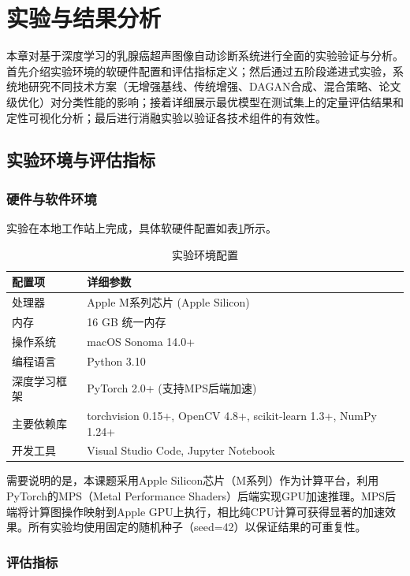 \section{实验与结果分析}

本章对基于深度学习的乳腺癌超声图像自动诊断系统进行全面的实验验证与分析。首先介绍实验环境的软硬件配置和评估指标定义；然后通过五阶段递进式实验，系统地研究不同技术方案（无增强基线、传统增强、DAGAN合成、混合策略、论文级优化）对分类性能的影响；接着详细展示最优模型在测试集上的定量评估结果和定性可视化分析；最后进行消融实验以验证各技术组件的有效性。


\subsection{实验环境与评估指标}

\subsubsection{硬件与软件环境}

实验在本地工作站上完成，具体软硬件配置如表\ref{tbl:env}所示。

\begin{table}[htb]
    \centering
    \caption{实验环境配置}
    \label{tbl:env}
    \begin{tabular}{ll}
        \toprule
        配置项 & 详细参数 \\
        \midrule
        处理器 & Apple M系列芯片 (Apple Silicon) \\
        内存   & 16 GB 统一内存 \\
        操作系统 & macOS Sonoma 14.0+ \\
        编程语言 & Python 3.10 \\
        深度学习框架 & PyTorch 2.0+ (支持MPS后端加速) \\
        主要依赖库 & torchvision 0.15+, OpenCV 4.8+, scikit-learn 1.3+, NumPy 1.24+ \\
        开发工具 & Visual Studio Code, Jupyter Notebook \\
        \bottomrule
    \end{tabular}
\end{table}

需要说明的是，本课题采用Apple Silicon芯片（M系列）作为计算平台，利用PyTorch的MPS（Metal Performance Shaders）后端实现GPU加速推理。MPS后端将计算图操作映射到Apple GPU上执行，相比纯CPU计算可获得显著的加速效果。所有实验均使用固定的随机种子（seed=42）以保证结果的可重复性。

\subsubsection{评估指标}

